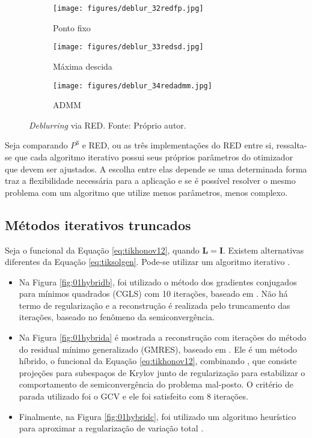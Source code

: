 \begin{figure}[H]
     \centering
     \begin{subfigure}[b]{0.32\textwidth}
         \centering
         \texttt{[image: figures/deblur\_32redfp.jpg]}
         \caption{Ponto fixo}
         \label{fig:medianreda}
     \end{subfigure}
     \hfill
     \begin{subfigure}[b]{0.32\textwidth}
         \centering
                  \texttt{[image: figures/deblur\_33redsd.jpg]}
         \caption{Máxima descida}
         \label{fig:medianredb}
     \end{subfigure}
          \hfill
     \begin{subfigure}[b]{0.32\textwidth}
         \centering
                  \texttt{[image: figures/deblur\_34redadmm.jpg]}
         \caption{ADMM}
         \label{fig:medianredc}
     \end{subfigure}
\caption[\textit{Deblurring} via RED.]{\textit{Deblurring} via RED. Fonte: Próprio autor.}
\label{fig:red}
\end{figure}

Seja comparando $P^3$ e RED, ou as três implementações do RED entre si, ressalta-se que cada algoritmo iterativo possui seus próprios parâmetros do otimizador que devem ser ajustados. A escolha entre elas depende se uma determinada forma traz a flexibilidade necessária para a aplicação e se é possível resolver o mesmo problema com um algoritmo que utilize menos parâmetros, menos complexo. 

\subsection{Métodos iterativos truncados}

 Seja o funcional da Equação \eqref{eq:tikhonov12}, quando $\mathbf{L} = \mathbf{I}$. Existem alternativas diferentes da Equação \eqref{eq:tiksolgen}. Pode-se utilizar um algoritmo iterativo \cite[pág. 82]{Mueller2012}.
\begin{itemize}
\item Na Figura \ref{fig:01hybridb}, foi utilizado o método dos gradientes conjugados para mínimos quadrados (CGLS) com 10 iterações, baseado em \cite{Gazzola2018}. Não há termo de regularização e a reconstrução é realizada pelo truncamento das iterações, baseado no fenômeno da semiconvergência. 

\item  Na Figura \ref{fig:01hybrida} é mostrada a reconstrução com iterações do método do residual mínimo generalizado (GMRES), baseado em \cite{Gazzola2018}. Ele é um método híbrido, o funcional da Equação \eqref{eq:tikhonov12}, combinando , que consiste projeções para subespaços de Krylov junto de regularização para estabilizar o comportamento de semiconvergência do problema mal-posto. O critério de parada utilizado foi o GCV e ele foi satisfeito com 8 iterações. 
\item Finalmente, na Figura \ref{fig:01hybridc}, foi utilizado um algoritmo heurístico para aproximar a regularização de variação total \cite{Gazzola2018}. 
\end{itemize}

